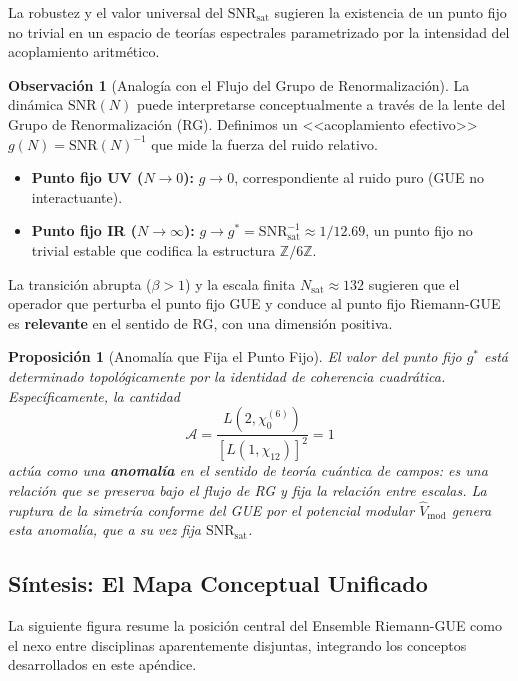 \documentclass[12pt, a4paper]{article}
\theoremstyle{plain}
\newtheorem{proposicion}[teorema]{Proposición}
\theoremstyle{definition}
\newtheorem{observacion}[teorema]{Observación}
\theoremstyle{remark}
\begin{document}
La robustez y el valor universal del $\mathrm{SNR}_{\mathrm{sat}}$ sugieren la existencia de un punto fijo no trivial en un espacio de teorías espectrales parametrizado por la intensidad del acoplamiento aritmético.

\begin{observacion}[Analogía con el Flujo del Grupo de Renormalización]
La dinámica $\mathrm{SNR}(N)$ puede interpretarse conceptualmente a través de la lente del Grupo de Renormalización (RG). Definimos un <<acoplamiento efectivo>> $g(N) = \mathrm{SNR}(N)^{-1}$ que mide la fuerza del ruido relativo.
\begin{itemize}
    \item \textbf{Punto fijo UV ($N \to 0$):} $g \to 0$, correspondiente al ruido puro (GUE no interactuante).
    \item \textbf{Punto fijo IR ($N \to \infty$):} $g \to g^* = \mathrm{SNR}_{\text{sat}}^{-1} \approx 1/12.69$, un punto fijo no trivial estable que codifica la estructura $\mathbb{Z}/6\mathbb{Z}$.
\end{itemize}
La transición abrupta ($\beta > 1$) y la escala finita $N_{\text{sat}} \approx 132$ sugieren que el operador que perturba el punto fijo GUE y conduce al punto fijo Riemann-GUE es \textbf{relevante} en el sentido de RG, con una dimensión positiva.
\end{observacion}

\begin{proposicion}[Anomalía que Fija el Punto Fijo]
El valor del punto fijo $g^*$ está determinado topológicamente por la identidad de coherencia cuadrática. Específicamente, la cantidad
\[
\mathcal{A} = \frac{L(2, \chi_0^{(6)})}{[L(1, \chi_{12})]^2} = 1
\]
actúa como una \textbf{anomalía} en el sentido de teoría cuántica de campos: es una relación que se preserva bajo el flujo de RG y fija la relación entre escalas. La ruptura de la simetría conforme del GUE por el potencial modular $\hat{V}_{\text{mod}}$ genera esta anomalía, que a su vez fija $\mathrm{SNR}_{\mathrm{sat}}$.
\end{proposicion}

\subsection{Síntesis: El Mapa Conceptual Unificado}
\label{ap:sintesis}

La siguiente figura resume la posición central del Ensemble Riemann-GUE como el nexo entre disciplinas aparentemente disjuntas, integrando los conceptos desarrollados en este apéndice.
\end{document}
